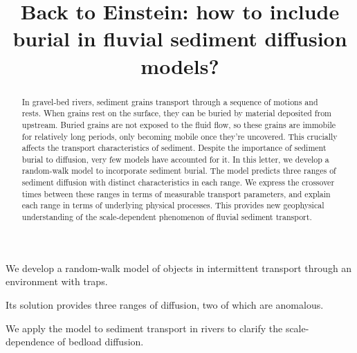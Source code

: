 \documentclass[]{agujournal2018}
\begin{document}
\title{Back to Einstein: how to include burial in fluvial sediment diffusion models?}


\begin{keypoints}
\item We develop a random-walk model of objects in intermittent transport through an environment with traps.
\item Its solution provides three ranges of diffusion, two of which are anomalous.
\item We apply the model to sediment transport in rivers to clarify the scale-dependence of bedload diffusion.

\end{keypoints}

\begin{abstract}
	

In gravel-bed rivers, sediment grains transport through a sequence of motions and rests.
When grains rest on the surface, they can be buried by material deposited from upstream.
Buried grains are not exposed to the fluid flow, so these grains are immobile for relatively long periods, only becoming mobile once they're uncovered.  
This crucially affects the transport characteristics of sediment.
Despite the importance of sediment burial to diffusion, very few models have accounted for it.
In this letter, we develop a random-walk model to incorporate sediment burial.
The model predicts three ranges of sediment diffusion with distinct characteristics in each range.
We express the crossover times between these ranges in terms of measurable transport parameters, and explain each range in terms of underlying physical processes.
This provides new geophysical understanding of the scale-dependent phenomenon of fluvial sediment transport.
\end{abstract}
\end{document}
